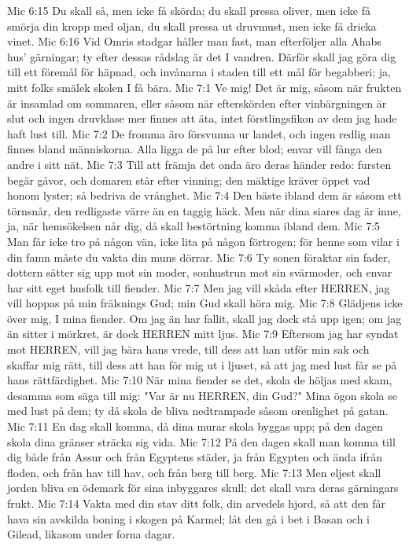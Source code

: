 Mic 6:15  Du skall så, men icke få skörda; du skall pressa oliver, men icke få smörja din kropp med oljan, du skall pressa ut druvmust, men icke få dricka vinet.
Mic 6:16  Vid Omris stadgar håller man fast, man efterföljer alla Ahabs hus' gärningar; ty efter dessas rådslag är det I vandren. Därför skall jag göra dig till ett föremål för häpnad, och invånarna i staden till ett mål för begabberi; ja, mitt folks smälek skolen I få bära.
Mic 7:1  Ve mig! Det är mig, såsom när frukten är insamlad om sommaren, eller såsom när efterskörden efter vinbärgningen är slut och ingen druvklase mer finnes att äta, intet förstlingsfikon av dem jag hade haft lust till.
Mic 7:2  De fromma äro försvunna ur landet, och ingen redlig man finnes bland människorna. Alla ligga de på lur efter blod; envar vill fånga den andre i sitt nät.
Mic 7:3  Till att främja det onda äro deras händer redo: fursten begär gåvor, och domaren står efter vinning; den mäktige kräver öppet vad honom lyster; så bedriva de vrånghet.
Mic 7:4  Den bäste ibland dem är såsom ett törnsnår, den redligaste värre än en taggig häck. Men när dina siares dag är inne, ja, när hemsökelsen når dig, då skall bestörtning komma ibland dem.
Mic 7:5  Man får icke tro på någon vän, icke lita på någon förtrogen; för henne som vilar i din famn måste du vakta din muns dörrar.
Mic 7:6  Ty sonen föraktar sin fader, dottern sätter sig upp mot sin moder, sonhustrun mot sin svärmoder, och envar har sitt eget husfolk till fiender.
Mic 7:7  Men jag vill skåda efter HERREN, jag vill hoppas på min frälsnings Gud; min Gud skall höra mig.
Mic 7:8  Glädjens icke över mig, I mina fiender. Om jag än har fallit, skall jag dock stå upp igen; om jag än sitter i mörkret, är dock HERREN mitt ljus.
Mic 7:9  Eftersom jag har syndat mot HERREN, vill jag bära hans vrede, till dess att han utför min sak och skaffar mig rätt, till dess att han för mig ut i ljuset, så att jag med lust får se på hans rättfärdighet.
Mic 7:10  När mina fiender se det, skola de höljas med skam, desamma som säga till mig: "Var är nu HERREN, din Gud?" Mina ögon skola se med lust på dem; ty då skola de bliva nedtrampade såsom orenlighet på gatan.
Mic 7:11  En dag skall komma, då dina murar skola byggas upp; på den dagen skola dina gränser sträcka sig vida.
Mic 7:12  På den dagen skall man komma till dig både från Assur och från Egyptens städer, ja från Egypten och ända ifrån floden, och från hav till hav, och från berg till berg.
Mic 7:13  Men eljest skall jorden bliva en ödemark för sina inbyggares skull; det skall vara deras gärningars frukt.
Mic 7:14  Vakta med din stav ditt folk, din arvedels hjord, så att den får hava sin avskilda boning i skogen på Karmel; låt den gå i bet i Basan och i Gilead, likasom under forna dagar.
